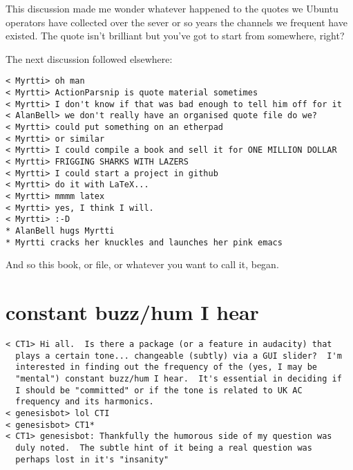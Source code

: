 \documentclass[a4paper]{book}
\begin{document}
This discussion made me wonder whatever happened to the quotes we Ubuntu
operators have collected over the sever or so years the channels we frequent
have existed. The quote isn't brilliant but you've got to start from somewhere, right?
\newpage{}

The next discussion followed elsewhere:
\begin{verbatim}
< Myrtti> oh man
< Myrtti> ActionParsnip is quote material sometimes
< Myrtti> I don't know if that was bad enough to tell him off for it
< AlanBell> we don't really have an organised quote file do we?
< Myrtti> could put something on an etherpad
< Myrtti> or similar
< Myrtti> I could compile a book and sell it for ONE MILLION DOLLAR
< Myrtti> FRIGGING SHARKS WITH LAZERS
< Myrtti> I could start a project in github
< Myrtti> do it with LaTeX...
< Myrtti> mmmm latex
< Myrtti> yes, I think I will.
< Myrtti> :-D
* AlanBell hugs Myrtti 
* Myrtti cracks her knuckles and launches her pink emacs
\end{verbatim}

And so this book, or file, or whatever you want to call it, began.
\newpage{}

\section*{constant buzz/hum I hear}

\begin{verbatim}
< CT1> Hi all.  Is there a package (or a feature in audacity) that 
  plays a certain tone... changeable (subtly) via a GUI slider?  I'm 
  interested in finding out the frequency of the (yes, I may be 
  "mental") constant buzz/hum I hear.  It's essential in deciding if 
  I should be "committed" or if the tone is related to UK AC 
  frequency and its harmonics.
< genesisbot> lol CTI
< genesisbot> CT1*
< CT1> genesisbot: Thankfully the humorous side of my question was 
  duly noted.  The subtle hint of it being a real question was 
  perhaps lost in it's "insanity"
\end{verbatim}
\end{document}
